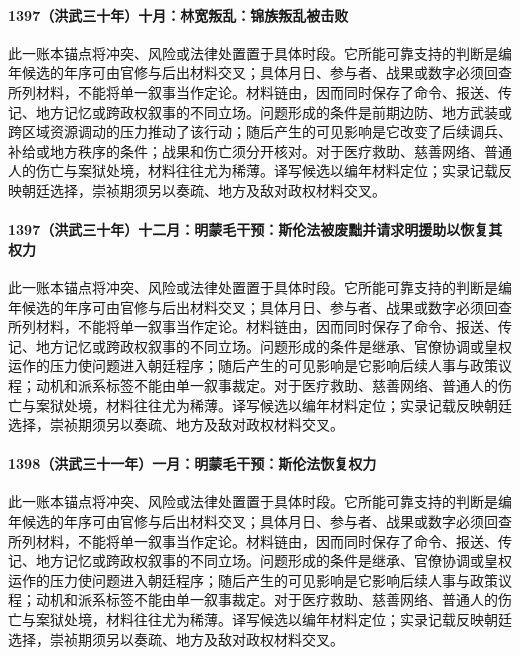 \paragraph{1397（洪武三十年）十月：林宽叛乱：锦族叛乱被击败} 此一账本锚点将冲突、风险或法律处置置于具体时段。它所能可靠支持的判断是编年候选的年序可由官修与后出材料交叉；具体月日、参与者、战果或数字必须回查所列材料，不能将单一叙事当作定论。材料链由，因而同时保存了命令、报送、传记、地方记忆或跨政权叙事的不同立场。问题形成的条件是前期边防、地方武装或跨区域资源调动的压力推动了该行动；随后产生的可见影响是它改变了后续调兵、补给或地方秩序的条件；战果和伤亡须分开核对。对于医疗救助、慈善网络、普通人的伤亡与案狱处境，材料往往尤为稀薄。译写候选以编年材料定位；实录记载反映朝廷选择，崇祯期须另以奏疏、地方及敌对政权材料交叉。

\paragraph{1397（洪武三十年）十二月：明蒙毛干预：斯伦法被废黜并请求明援助以恢复其权力} 此一账本锚点将冲突、风险或法律处置置于具体时段。它所能可靠支持的判断是编年候选的年序可由官修与后出材料交叉；具体月日、参与者、战果或数字必须回查所列材料，不能将单一叙事当作定论。材料链由，因而同时保存了命令、报送、传记、地方记忆或跨政权叙事的不同立场。问题形成的条件是继承、官僚协调或皇权运作的压力使问题进入朝廷程序；随后产生的可见影响是它影响后续人事与政策议程；动机和派系标签不能由单一叙事裁定。对于医疗救助、慈善网络、普通人的伤亡与案狱处境，材料往往尤为稀薄。译写候选以编年材料定位；实录记载反映朝廷选择，崇祯期须另以奏疏、地方及敌对政权材料交叉。

\paragraph{1398（洪武三十一年）一月：明蒙毛干预：斯伦法恢复权力} 此一账本锚点将冲突、风险或法律处置置于具体时段。它所能可靠支持的判断是编年候选的年序可由官修与后出材料交叉；具体月日、参与者、战果或数字必须回查所列材料，不能将单一叙事当作定论。材料链由，因而同时保存了命令、报送、传记、地方记忆或跨政权叙事的不同立场。问题形成的条件是继承、官僚协调或皇权运作的压力使问题进入朝廷程序；随后产生的可见影响是它影响后续人事与政策议程；动机和派系标签不能由单一叙事裁定。对于医疗救助、慈善网络、普通人的伤亡与案狱处境，材料往往尤为稀薄。译写候选以编年材料定位；实录记载反映朝廷选择，崇祯期须另以奏疏、地方及敌对政权材料交叉。
